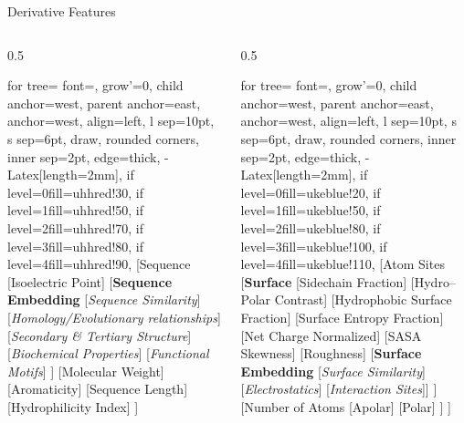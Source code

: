 \begin{frame}{Derivative Features}
	\begin{columns}[T, totalwidth=\linewidth]
		\hspace*{-1cm}
		\begin{column}{0.5\linewidth}
			\begin{forest}
				for tree={
					font=\scriptsize,
					grow'=0,
					child anchor=west,
					parent anchor=east,
					anchor=west,
					align=left,
					l sep=10pt,
					s sep=6pt,
					draw,
					rounded corners,
					inner sep=2pt,
					edge={thick, -{Latex[length=2mm]}},
					if level=0{fill=uhhred!30}{},
					if level=1{fill=uhhred!50}{},
					if level=2{fill=uhhred!70}{},
					if level=3{fill=uhhred!80}{},
					if level=4{fill=uhhred!90}{},
				}
				[Sequence
				[Isoelectric Point]
				[\textbf{Sequence Embedding}
				[\textit{Sequence Similarity}]
				[\textit{Homology/Evolutionary relationships}]
				[\textit{Secondary \& Tertiary Structure}]
				[\textit{Biochemical Properties}]
				[\textit{Functional Motifs}]
				]
				[Molecular Weight]
				[Aromaticity]
				[Sequence Length]
				[Hydrophilicity Index]
				]
			\end{forest}
		\end{column}

		\begin{column}{0.5\linewidth}
			\hspace*{-1.1cm}
			\begin{forest}
				for tree={
					font=\scriptsize,
					grow'=0,
					child anchor=west,
					parent anchor=east,
					anchor=west,
					align=left,
					l sep=10pt,
					s sep=6pt,
					draw,
					rounded corners,
					inner sep=2pt,
					edge={thick, -{Latex[length=2mm]}},
					if level=0{fill=ukeblue!20}{},
					if level=1{fill=ukeblue!50}{},
					if level=2{fill=ukeblue!80}{},
					if level=3{fill=ukeblue!100}{},
					if level=4{fill=ukeblue!110}{},
				}
				[Atom Sites
				[\textbf{Surface}
				[Sidechain Fraction]
				[Hydro–Polar Contrast]
				[Hydrophobic Surface Fraction]
				[Surface Entropy Fraction]
				[Net Charge Normalized]
				[SASA Skewness]
				[Roughness]
				[\textbf{Surface Embedding} [\textit{Surface Similarity}] [\textit{Electrostatics}] [\textit{Interaction Sites}]]
				]
				[Number of Atoms
				[Apolar]
				[Polar]
				]
				]
			\end{forest}
		\end{column}
		
	\end{columns}
\end{frame}


